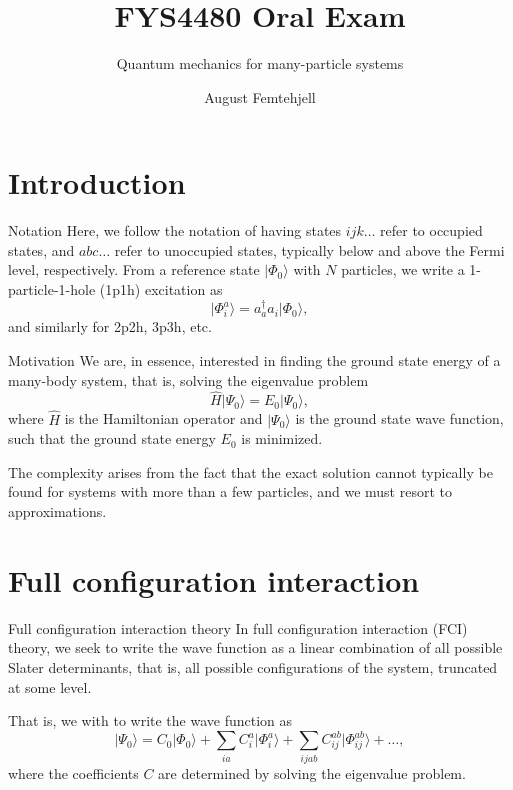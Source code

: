 \documentclass[UKenglish,aspectratio=169]{beamer}
\title{FYS4480 Oral Exam}
\subtitle{Quantum mechanics for many-particle systems}
\author{August Femtehjell}
\begin{document}
\uiofrontpage[
    date={16th December, 2024},
]

\section{Introduction}
\begin{frame}{Notation}
    Here, we follow the notation of having states $ijk\ldots$ refer to occupied states, and $abc\ldots$ refer to unoccupied states, typically below and above the Fermi level, respectively.
    From a reference state $\lvert \Phi_0 \rangle$ with $N$ particles, we write a 1-particle-1-hole (1p1h) excitation as
    \begin{equation}
        \lvert \Phi_{i}^{a} \rangle
        = a_{a}^\dagger a_{i} \lvert \Phi_0 \rangle,
    \end{equation}
    and similarly for 2p2h, 3p3h, etc.
\end{frame}

\begin{frame}{Motivation}
    We are, in essence, interested in finding the ground state energy of a many-body system, that is, solving the eigenvalue problem
    \begin{equation}
        \hat{H} \lvert \Psi_0 \rangle = E_0 \lvert \Psi_0 \rangle,
    \end{equation}
    where $\hat{H}$ is the Hamiltonian operator and $\lvert \Psi_0 \rangle$ is the ground state wave function, such that the ground state energy $E_0$ is minimized.

    \bigskip

    The complexity arises from the fact that the exact solution cannot typically be found for systems with more than a few particles, and we must resort to approximations.
\end{frame}

\section{Full configuration interaction}

\begin{frame}{Full configuration interaction theory}
    In full configuration interaction (FCI) theory, we seek to write the wave function as a linear combination of all possible Slater determinants, that is, all possible configurations of the system, truncated at some level.

    \bigskip

    That is, we with to write the wave function as
    \begin{equation}
        \lvert \Psi_0 \rangle = C_0 \lvert \Phi_0 \rangle + \sum_{ia} C_i^a \lvert \Phi_i^a \rangle + \sum_{ijab} C_{ij}^{ab} \lvert \Phi_{ij}^{ab} \rangle + \ldots,
    \end{equation}
    where the coefficients $C$ are determined by solving the eigenvalue problem.
\end{frame}
\end{document}
